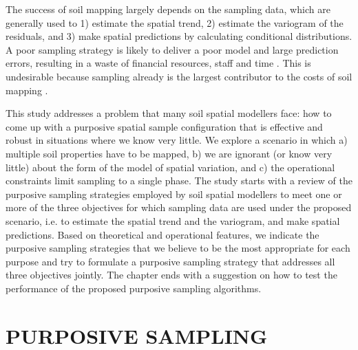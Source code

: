 The success of soil mapping largely depends on the sampling data, which are generally used to 1) estimate the 
spatial trend, 2) estimate the variogram of the residuals, and 3) make spatial predictions by calculating 
conditional distributions. A poor sampling strategy is likely to deliver a poor model and large prediction 
errors, resulting in a waste of financial resources, staff and time \cite{vanGroenigenEtAl1999,  
deGruijterEtAl2006, LanEtAl2010}. This is undesirable because sampling already is the largest contributor to 
the costs of soil mapping \cite{WebsterEtAl1990, vanGroenigenEtAl1999, KempenEtAl2012}.

This study addresses a problem that many soil spatial modellers face: how to come up with a purposive spatial 
sample configuration that is effective and robust in situations where we know very little. We explore a 
scenario in which a) multiple soil properties have to be mapped, b) we are ignorant (or know very little) about 
the form of the model of spatial variation, and c) the operational constraints limit sampling to a single 
phase. The study starts with a review of the purposive sampling strategies employed by soil spatial modellers 
to meet one or more of the three objectives for which sampling data are used under the proposed scenario, i.e. 
to estimate the spatial trend and the variogram, and make spatial predictions. Based on theoretical and 
operational features, we indicate the purposive sampling strategies that we believe to be the most appropriate 
for each purpose and try to formulate a purposive sampling strategy that addresses all three objectives 
jointly. The chapter ends with a suggestion on how to test the performance of the proposed purposive sampling 
algorithms.


\section{PURPOSIVE SAMPLING}


